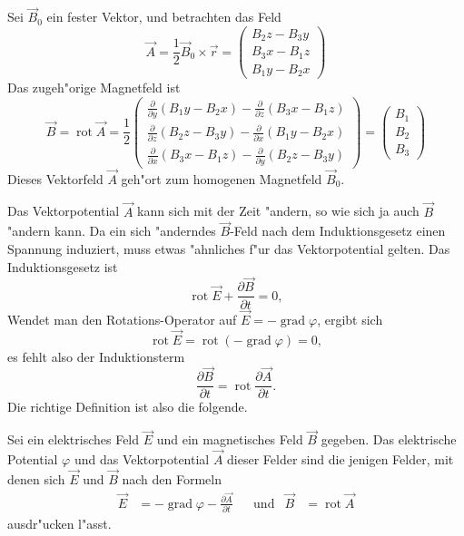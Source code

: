 \begin{beispiel}
Sei $\vec B_0$ ein fester Vektor, und betrachten das Feld
\[
\vec A=\frac12\vec B_0\times \vec r=\begin{pmatrix}
B_2z-B_3y\\
B_3x-B_1z\\
B_1y-B_2x
\end{pmatrix}
\]
Das zugeh"orige Magnetfeld ist
\begin{equation}
\vec B
=
\operatorname{rot}\vec A
=
\frac12
\begin{pmatrix}
\frac{\partial}{\partial y}(B_1y-B_2x)-\frac{\partial}{\partial z}(B_3x-B_1z)\\
\frac{\partial}{\partial z}(B_2z-B_3y)-\frac{\partial}{\partial x}(B_1y-B_2x)\\
\frac{\partial}{\partial x}(B_3x-B_1z)-\frac{\partial}{\partial y}(B_2z-B_3y)
\end{pmatrix}
=
\begin{pmatrix}
B_1\\B_2\\B_3
\end{pmatrix}
\end{equation}
Dieses Vektorfeld $\vec A$ geh"ort zum homogenen Magnetfeld $\vec B_0$.
\end{beispiel}

Das Vektorpotential $\vec A$ kann sich mit der Zeit "andern, so wie sich
ja auch $\vec B$ "andern kann.
Da ein sich "anderndes $\vec B$-Feld nach dem Induktionsgesetz einen
Spannung induziert, muss etwas "ahnliches f"ur das Vektorpotential gelten.
Das Induktionsgesetz ist
\[
\operatorname{rot}\vec E +\frac{\partial\vec B}{\partial t}=0,
\]
Wendet man den Rotations-Operator auf
$\vec E = -\operatorname{grad}\varphi$, ergibt sich
\[
\operatorname{rot}\vec E=\operatorname{rot}(-\operatorname{grad}\varphi)=0,
\]
es fehlt also der Induktionsterm
\[
\frac{\partial\vec B}{\partial t}
=
\operatorname{rot}\frac{\partial\vec A}{\partial t}.
\]
Die richtige Definition ist also die folgende.

\begin{definition}
Sei ein elektrisches Feld $\vec E$ und ein magnetisches Feld $\vec B$
gegeben.
Das elektrische Potential $\varphi$ und das Vektorpotential $\vec A$ 
dieser Felder sind die jenigen Felder, mit denen sich $\vec E$ und $\vec B$
nach den Formeln
\begin{equation}
\begin{aligned}
\vec E
&=
-\operatorname{grad}\varphi
-\frac{\partial\vec A}{\partial t}
&&\text{und}&
\vec B
&=
\operatorname{rot}\vec A
\end{aligned}
\label{potentiale}
\end{equation}
ausdr"ucken l"asst.
\end{definition}


